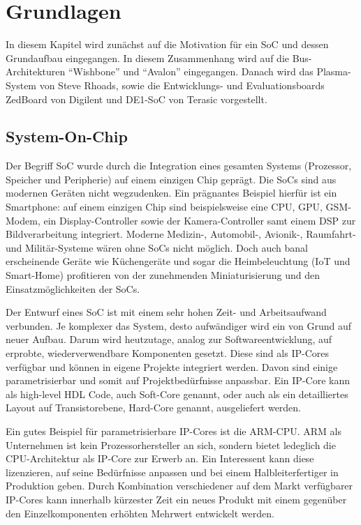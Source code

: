 \chapter{Grundlagen}
\label{cha:basics}

In diesem Kapitel wird zunächst auf die Motivation für ein \gls{SoC} und dessen Grundaufbau eingegangen. In diesem Zusammenhang wird auf die Bus-Architekturen \enquote{Wishbone} und \enquote{Avalon} eingegangen. Danach wird das Plasma-System von Steve Rhoads, sowie die Entwicklungs- und Evaluationsboards ZedBoard \cite{manual:zedboard} von Digilent und DE1-SoC \cite{manual:de1soc} von Terasic vorgestellt.

\section{System-On-Chip}

Der Begriff \gls{SoC} wurde durch die Integration eines gesamten Systems (Prozessor, Speicher und Peripherie) auf einem einzigen Chip geprägt.
Die \glspl{SoC} sind aus modernen Geräten nicht wegzudenken. Ein prägnantes Beispiel hierfür ist ein Smartphone: auf einem einzigen Chip sind beispielsweise eine \gls{CPU}, \gls{GPU}, \gls{GSM}-Modem, ein Display-Controller sowie der Kamera-Controller samt einem \gls{DSP} zur Bildverarbeitung integriert. Moderne Medizin-, Automobil-, Avionik-, Raumfahrt- und Militär-Systeme wären ohne \glspl{SoC} nicht möglich. Doch auch banal erscheinende Geräte wie Küchengeräte und sogar die Heimbeleuchtung (\gls{IoT} und Smart-Home) profitieren von der zunehmenden Miniaturisierung und den Einsatzmöglichkeiten der \glspl{SoC}. 

Der Entwurf eines \gls{SoC} ist mit einem sehr hohen Zeit- und Arbeitsaufwand verbunden. Je komplexer das System, desto aufwändiger wird ein von Grund auf neuer Aufbau. \cite[189]{book:embedded_sopc_design} Darum wird heutzutage, analog zur Softwareentwicklung, auf erprobte, wiederverwendbare Komponenten gesetzt. Diese sind als IP-Cores verfügbar und können in eigene Projekte integriert werden. Davon sind einige parametrisierbar und somit auf Projektbedürfnisse anpassbar. Ein IP-Core kann als high-level \gls{HDL} Code, auch Soft-Core genannt, oder auch als ein detailliertes Layout auf Transistorebene, Hard-Core genannt, ausgeliefert werden. \cite[189]{book:embedded_sopc_design} 

Ein gutes Beispiel für parametrisierbare IP-Cores ist die \gls{ARM}-CPU. ARM als Unternehmen ist kein Prozessorhersteller an sich, sondern bietet ledeglich die \gls{CPU}-Architektur als IP-Core zur Erwerb an. Ein Interessent kann diese lizenzieren, auf seine Bedürfnisse anpassen und bei einem Halbleiterfertiger in Produktion geben. Durch Kombination verschiedener auf dem Markt verfügbarer IP-Cores kann innerhalb kürzester Zeit ein neues Produkt mit einem gegenüber den Einzelkomponenten erhöhten Mehrwert entwickelt werden.

